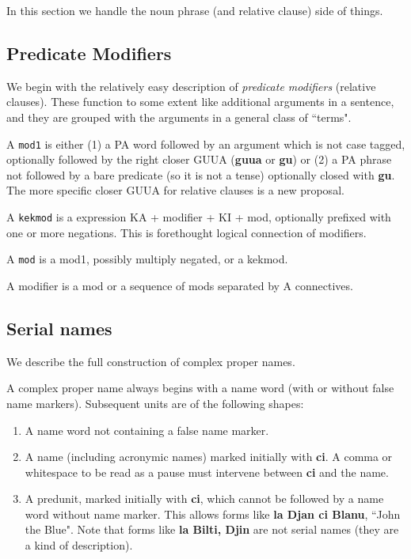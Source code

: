 \documentclass[12pt]{book}
\begin{document}
In this section we handle the noun phrase (and relative clause) side of things.

\subsection{Predicate Modifiers}

We begin with the relatively easy description of {\em predicate modifiers} (relative clauses).  These function to some extent like additional arguments
in a sentence, and they are grouped with the arguments in a general class of ``terms".

A {\tt mod1} is either (1) a PA word followed by an argument which is not case tagged, optionally followed by the right closer GUUA ({\bf guua} or {\bf gu})
or (2) a PA phrase not followed by a bare predicate (so it is not a tense) optionally closed with {\bf gu}.  The more specific closer GUUA for relative clauses
is a new proposal.

A {\tt kekmod} is a expression KA + modifier + KI + mod, optionally prefixed with one or more negations.  This is forethought logical connection of
modifiers.

A {\tt mod} is a mod1, possibly multiply negated, or a kekmod.

A modifier is a mod or a sequence of mods separated by A connectives.

\subsection{Serial names}

We describe the full construction of complex proper names.

A complex proper name always begins with a name word (with or without false name markers).  Subsequent units are of the following shapes:

\begin{enumerate}

\item A name word not containing a false name marker.

\item A name (including acronymic names) marked initially with {\bf ci}.  A comma or whitespace to be read as a pause must intervene between {\bf ci} and the name.

\item A predunit, marked initially with {\bf ci}, which cannot be followed by a name word without name marker.  This allows forms like {\bf la Djan ci Blanu}, ``John the Blue".  Note that forms
like {\bf la Bilti, Djin} are not serial names (they are a kind of description).


\end{enumerate}
\end{document}
